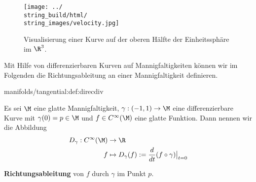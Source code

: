 \documentclass[letterpaper,10pt,german]{jupyterBook}
\begin{document}
\begin{figure}[htbp]
\centering


\noindent\texttt{[image: ../\\string\_build/html/\\string\_images/velocity.jpg]}
\caption{Visualisierung einer Kurve auf der oberen Hälfte der Einheitssphäre im \(\R^3\).}\label{\detokenize{manifolds/tangential:fig-velocity}}\end{figure}

\par
Mit Hilfe von differenzierbaren Kurven auf Mannigfaltigkeiten können wir im Folgenden die Richtungsableitung an einer Mannigfaltigkeit definieren.
\begin{definition}{}{manifolds/tangential:def:direcdiv}



\par
Es sei \(\M\) eine glatte Mannigfaltigkeit, \(\gamma:(-1,1)\to\M\) eine differenzierbare Kurve mit \(\gamma(0)=p\in\M\) und \(f \in C^\infty(\M)\) eine glatte Funktion.
Dann nennen wir die Abbildung
\begin{align*}
D_\gamma : C^\infty(\M) &\to \R\\
f &\mapsto D_\gamma(f):=\frac{d}{dt}(f\circ \gamma)\big\rvert_{t=0}
\end{align*}
\par
\textbf{Richtungsableitung} von \(f\) durch \(\gamma\) im Punkt \(p\).
\end{definition}
\end{document}
